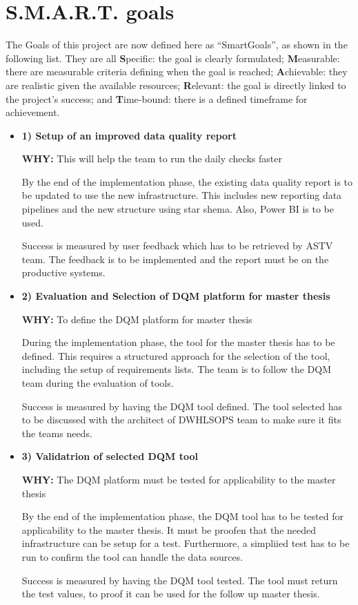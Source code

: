 \section{S.M.A.R.T. goals}
\label{ResearchSmartGoals}
The Goals of this project are now defined here as “\gls{SmartGoals}”, as shown in the following list. They are all \textbf{S}pecific: the goal is clearly formulated; \textbf{M}easurable: there are measurable criteria defining when the goal is reached; \textbf{A}chievable: they are realistic given the available resources; \textbf{R}elevant: the goal is directly linked to the project’s success; and \textbf{T}ime-bound: there is a defined timeframe for achievement.


\begin{itemize}
\item \textbf{1) Setup of an improved data quality report}
    
\textbf{WHY:} This will help the team to run the daily checks faster

By the end of the implementation phase, the existing data quality report is to be updated to use the new infrastructure. This includes new reporting data pipelines and the new structure using star shema. Also, Power BI is to be used.

Success is measured by user feedback which has to be retrieved by \gls{ASTV} team. The feedback is to be implemented and the report must be on the productive systems.


\item \textbf{2) Evaluation and Selection of DQM platform for master thesis}
    
\textbf{WHY:} To define the DQM platform for master thesis

During the implementation phase, the tool for the master thesis has to be defined. This requires a structured approach for the selection of the tool, including the setup of requirements lists. The team is to follow the DQM team during the evaluation of tools.

Success is measured by having the DQM tool defined. The tool selected has to be discussed with the architect of \gls{DWHLSOPS} team to make sure it fits the teams needs.


\item \textbf{3) Validatrion of selected DQM tool}
    
\textbf{WHY:} The DQM platform must be tested for applicability to the master thesis

By the end of the implementation phase, the DQM tool has to be tested for applicability to the master thesis. It must be proofen that the needed infrastructure can be setup for a test. Furthermore, a simpliied test has to be run to confirm the tool can handle the data sources.

Success is measured by having the DQM tool tested. The tool must return the test values, to proof it can be used for the follow up master thesis.

\end{itemize}

